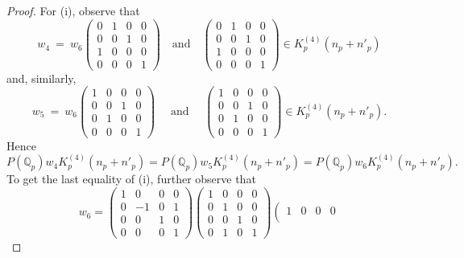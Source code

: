 \documentclass[10pt,a4paper]{amsart}
\newcommand{\mirp}[1]{K_p^{(4)}(#1)}
\begin{document}
\begin{proof}
For (i), observe that
$$%
		w_4 \ = \ w_6\left(\begin{smallmatrix}
			0 & 1 & 0 & 0 \\
			0 & 0 & 1 & 0 \\
			1 & 0 & 0 & 0 \\
			0 & 0 & 0 & 1
		\end{smallmatrix}\right) 
		\quad \text{and} \quad 
		\left(\begin{smallmatrix}
			0 & 1 & 0 & 0 \\
			0 & 0 & 1 & 0 \\
			1 & 0 & 0 & 0 \\
			0 & 0 & 0 & 1
		\end{smallmatrix}\right) \in \mirp{n_p + n'_p}
$$
and, similarly, 
$$
w_5 \ = \ w_6 \left(\begin{smallmatrix}
			1 & 0 & 0 & 0 \\
			0 & 0 & 1 & 0 \\
			0 & 1 & 0 & 0 \\
			0 & 0 & 0 & 1
		\end{smallmatrix}\right)
		\quad \text{ and } \quad 
		\left(\begin{smallmatrix}
			1 & 0 & 0 & 0 \\
			0 & 0 & 1 & 0 \\
			0 & 1 & 0 & 0 \\
			0 & 0 & 0 & 1
		\end{smallmatrix}\right) \in \mirp{n_p + n'_p}.
$$
Hence $P(\mathbb{Q}_p)w_4 \mirp{n_p + n'_p} = P(\mathbb{Q}_p)w_5 \mirp{n_p + n'_p} =
	P(\mathbb{Q}_p)w_6 \mirp{n_p + n'_p}.$ To get the last equality of (i), further observe that
	\begin{equation*}
		w_6=
		\left(\begin{smallmatrix}
			1 & 0 & 0 & 0 \\
			0 & -1 & 0 & 1 \\
			0 & 0 & 1 & 0 \\
			0 & 0 & 0 & 1
		\end{smallmatrix}\right)
		\left(\begin{smallmatrix}
			1 & 0 & 0 & 0 \\
			0 & 1 & 0 & 0 \\
			0 & 0 & 1 & 0 \\
			0 & 1 & 0 & 1
		\end{smallmatrix}\right)
		\left(\begin{smallmatrix}
			1 & 0 & 0 & 0 \\

\end{smallmatrix}
\end{equation*}
\end{proof}
\end{document}

